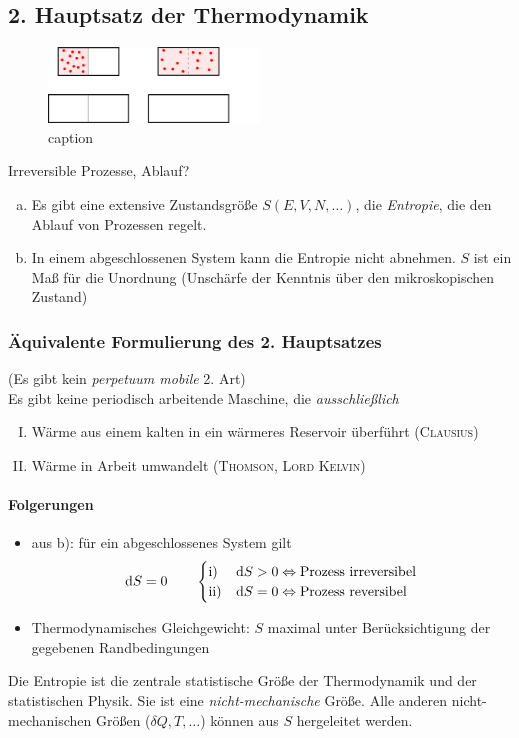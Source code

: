 \subsection{2. Hauptsatz der Thermodynamik}
\begin{figure}[H]
\begin{center}
  \includegraphics[width=0.5\textwidth]{../img/irrevProcess.pdf}
  \caption{caption}  %
  \label{img:irrevProcess}
\end{center}
\end{figure}
Irreversible Prozesse, Ablauf?
\begin{enumerate}[a)]
    \item Es gibt eine extensive Zustandsgröße $S(E, V, N, \ldots)$, die \emph{Entropie}, die den Ablauf von Prozessen regelt.
    \item In einem abgeschlossenen System kann die Entropie nicht abnehmen. $S$ ist ein Maß für die Unordnung
    (Unschärfe der Kenntnis über den mikroskopischen Zustand)
\end{enumerate}

\subsubsection{Äquivalente Formulierung des 2. Hauptsatzes}
(Es gibt kein \emph{perpetuum mobile} 2. Art) \\
Es gibt keine periodisch arbeitende Maschine, die \emph{ausschließlich}
\begin{enumerate}[I.]
    \item Wärme aus einem kalten in ein wärmeres Reservoir überführt (\textsc{Clausius})
    \item Wärme in Arbeit umwandelt (\textsc{Thomson}, \textsc{Lord Kelvin})
\end{enumerate}
\paragraph{Folgerungen}
\begin{itemize}
    \item aus b): für ein abgeschlossenes System gilt
    \begin{equation}
        \mathrm{d} S = 0 \qquad
        \begin{cases}
            \text{i) } & \mathrm{d} S > 0 \Leftrightarrow \text{Prozess irreversibel} \\
            \text{ii)} & \mathrm{d} S = 0 \Leftrightarrow \text{Prozess reversibel}
        \end{cases}
    \end{equation}
    \item Thermodynamisches Gleichgewicht: $S$ maximal unter Berücksichtigung der gegebenen Randbedingungen
\end{itemize}
Die Entropie ist die zentrale statistische Größe der Thermodynamik und der statistischen Physik. Sie ist eine \emph{nicht-mechanische} Größe.
Alle anderen nicht-mechanischen Größen ($\delta Q, T, \ldots$) können aus $S$ hergeleitet werden.
